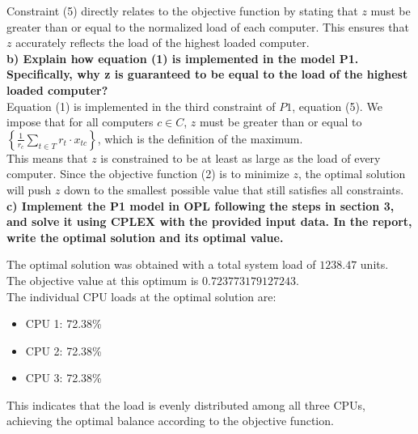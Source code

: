 \documentclass{article}
\begin{document}
Constraint (5) directly relates to the objective function by stating that \( z \) must be greater than or equal to the normalized load of each computer. This ensures that \( z \) accurately reflects the load of the highest loaded computer.\\

\textbf{b) Explain how equation (1) is implemented in the model P1. Specifically, why z is guaranteed to be equal to the load of the highest loaded computer?}\\


Equation (1) is implemented in the third constraint of $P1$, equation (5). We impose that for all computers \( c \in C \), \( z \) must be greater than or equal to \( \left\{ \frac{1}{r_c} \sum_{t \in T} r_t \cdot x_{tc} \right\} \), which is the definition of the maximum.\\

This means that \( z \) is constrained to be at least as large as the load of every computer. Since the objective function (2) is to minimize \( z \), the optimal solution will push \( z \) down to the smallest possible value that still satisfies all constraints.\\


\textbf{c) Implement the P1 model in OPL following the steps in section 3, and solve it using CPLEX with the provided input data. In the report, write the optimal solution and its optimal value.}\\



\vspace{0.5cm}

The optimal solution was obtained with a total system load of $1238.47$ units. 
\\

The objective value at this optimum is $0.723773179127243$.
\\

The individual CPU loads at the optimal solution are:
\begin{itemize}
    \item CPU 1: 72.38\%
    \item CPU 2: 72.38\%
    \item CPU 3: 72.38\%
\end{itemize}

This indicates that the load is evenly distributed among all three CPUs, achieving the optimal balance according to the objective function.
\\
\end{document}
